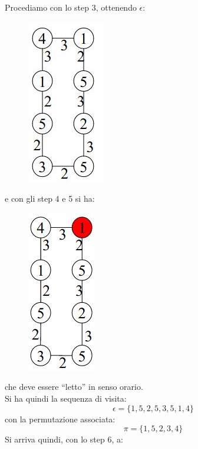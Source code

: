 \begin{esempio}
\begin{figure}[H]
																      		\end{figure}
																      		Procediamo con lo step 3, ottenendo $\epsilon$:
																      		\begin{figure}[H]
																      			\centering
																      			\includegraphics[scale = 0.4]{img/ch4.jpg}
																      		\end{figure}
																      		e con gli step 4 e 5 si ha:
																      		\begin{figure}[H]
																      			\centering
																      			\includegraphics[scale = 0.4]{img/ch5.jpg}
																      		\end{figure}
																      		che deve essere ``letto'' in senso orario.\\
																      		Si ha quindi la sequenza di visita:
																      		\[\epsilon=\{1,5,2,5,3,5,1,4\}\]
																      		con la permutazione associata:
																      		\[\pi=\{1,5,2,3,4\}\]
																      		Si arriva quindi, con lo step 6, a:
																      		\begin{figure}[H]
																      			\centering

\end{figure}
\end{esempio}
